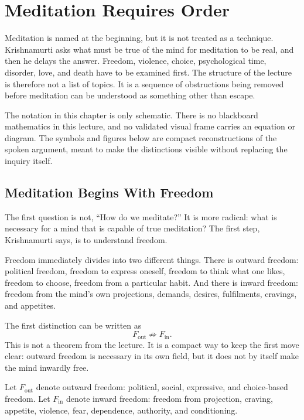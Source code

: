\chapter{Meditation Requires Order}

Meditation is named at the beginning, but it is not treated as a technique. Krishnamurti asks what must be true of the mind for meditation to be real, and then he delays the answer. Freedom, violence, choice, psychological time, disorder, love, and death have to be examined first. The structure of the lecture is therefore not a list of topics. It is a sequence of obstructions being removed before meditation can be understood as something other than escape.

The notation in this chapter is only schematic. There is no blackboard mathematics in this lecture, and no validated visual frame carries an equation or diagram. The symbols and figures below are compact reconstructions of the spoken argument, meant to make the distinctions visible without replacing the inquiry itself.

\section{Meditation Begins With Freedom}

The first question is not, ``How do we meditate?'' It is more radical: what is necessary for a mind that is capable of true meditation? The first step, Krishnamurti says, is to understand freedom.

Freedom immediately divides into two different things. There is outward freedom: political freedom, freedom to express oneself, freedom to think what one likes, freedom to choose, freedom from a particular habit. And there is inward freedom: freedom from the mind's own projections, demands, desires, fulfilments, cravings, and appetites.

The first distinction can be written as
\begin{equation}
F_{\mathrm{out}} \not\Rightarrow F_{\mathrm{in}} .
\end{equation}
This is not a theorem from the lecture. It is a compact way to keep the first move clear: outward freedom is necessary in its own field, but it does not by itself make the mind inwardly free.

\begin{definition}
Let \(F_{\mathrm{out}}\) denote outward freedom: political, social, expressive, and choice-based freedom. Let \(F_{\mathrm{in}}\) denote inward freedom: freedom from projection, craving, appetite, violence, fear, dependence, authority, and conditioning.
\end{definition}

